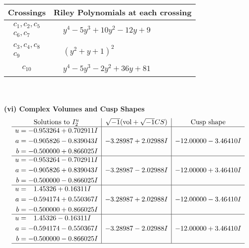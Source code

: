 \documentclass[1p]{elsarticle_modified}
\theoremstyle{definition}
\newcommand{\I}{\sqrt{-1}}
\begin{document}
\begin{tabular}{m{50pt}|m{274pt}}
Crossings & \hspace{64pt}Riley Polynomials at each crossing \\
\hline $$\begin{aligned}c_{1},c_{2},c_{5}\\c_{6},c_{7}\end{aligned}$$&$\begin{aligned}
&y^4-5 y^3+10 y^2-12 y+9
\end{aligned}$\\
\hline $$\begin{aligned}c_{3},c_{4},c_{8}\\c_{9}\end{aligned}$$&$\begin{aligned}
&(y^2+y+1)^2
\end{aligned}$\\
\hline $$\begin{aligned}c_{10}\end{aligned}$$&$\begin{aligned}
&y^4-5 y^3-2 y^2+36 y+81
\end{aligned}$\\
\hline
\end{tabular}\\~\\
\newpage\flushleft \textbf{(vi) Complex Volumes and Cusp Shapes}
$$\begin{array}{c|c|c}  
\text{Solutions to }I^u_{2}& \I (\text{vol} + \sqrt{-1}CS) & \text{Cusp shape}\\
 \hline 
\begin{aligned}
u &= -0.953264 + 0.702911 I \\
a &= -0.905826 - 0.839043 I \\
b &= -0.500000 + 0.866025 I\end{aligned}
 & -3.28987 + 2.02988 I & -12.00000 - 3.46410 I \\ \hline\begin{aligned}
u &= -0.953264 - 0.702911 I \\
a &= -0.905826 + 0.839043 I \\
b &= -0.500000 - 0.866025 I\end{aligned}
 & -3.28987 - 2.02988 I & -12.00000 + 3.46410 I \\ \hline\begin{aligned}
u &= \phantom{-}1.45326 + 0.16311 I \\
a &= -0.594174 + 0.550367 I \\
b &= -0.500000 + 0.866025 I\end{aligned}
 & -3.28987 + 2.02988 I & -12.00000 - 3.46410 I \\ \hline\begin{aligned}
u &= \phantom{-}1.45326 - 0.16311 I \\
a &= -0.594174 - 0.550367 I \\
b &= -0.500000 - 0.866025 I\end{aligned}
 & -3.28987 - 2.02988 I & -12.00000 + 3.46410 I\\
 \hline 
 \end{array}$$\newpage\newpage\renewcommand{\arraystretch}{1}
\end{document}
